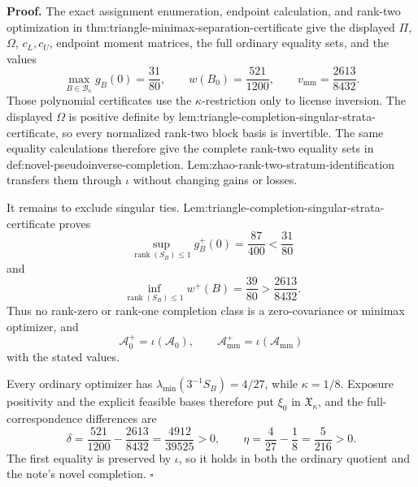 \textbf{Proof.}
The exact assignment enumeration, endpoint calculation, and rank-two optimization in thm:triangle-minimax-separation-certificate give the displayed \(\Pi\), \(\Omega\), \(c_L,c_U\), endpoint moment matrices, the full ordinary equality sets, and the values
\[
\max_{B\in\mathcal B_\kappa}g_B(0)=\frac{31}{80},
\qquad w(B_0)=\frac{521}{1200},
\qquad v_{\mathrm{mm}}=\frac{2613}{8432}.
\]
Those polynomial certificates use the \(\kappa\)-restriction only to license inversion.  The displayed \(\Omega\) is positive definite by lem:triangle-completion-singular-strata-certificate, so every normalized rank-two block basis is invertible.  The same equality calculations therefore give the complete rank-two equality sets in def:novel-pseudoinverse-completion.  Lem:zhao-rank-two-stratum-identification transfers them through \(\iota\) without changing gains or losses.

It remains to exclude singular ties.  Lem:triangle-completion-singular-strata-certificate proves
\[
\sup_{\operatorname{rank}(S_B)\le1}g_B^+(0)=\frac{87}{400}<\frac{31}{80}
\]
and
\[
\inf_{\operatorname{rank}(S_B)\le1}w^+(B)=\frac{39}{80}>\frac{2613}{8432}.
\]
Thus no rank-zero or rank-one completion class is a zero-covariance or minimax optimizer, and
\[
\mathcal A_0^+=\iota(\mathcal A_0),
\qquad \mathcal A_{\mathrm{mm}}^+=\iota(\mathcal A_{\mathrm{mm}})
\]
with the stated values.

Every ordinary optimizer has \(\lambda_{\min}(3^{-1}S_B)=4/27\), while \(\kappa=1/8\).  Exposure positivity and the explicit feasible bases therefore put \(\xi_0\) in \(\mathfrak X_\kappa\), and the full-correspondence differences are
\[
\delta=\frac{521}{1200}-\frac{2613}{8432}=\frac{4912}{39525}>0,
\qquad \eta=\frac4{27}-\frac18=\frac5{216}>0.
\]
The first equality is preserved by \(\iota\), so it holds in both the ordinary quotient and the note's novel completion. \(\square\)